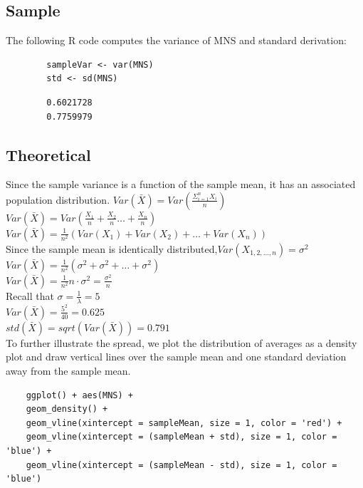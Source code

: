 \documentclass[11pt]{article} %
\begin{document}
\subsection{Sample}
The following R code computes the variance of MNS and standard derivation:
	\begin{lstlisting}
		sampleVar <- var(MNS)
		std <- sd(MNS)
	\end{lstlisting}
	\begin{lstlisting}
		0.6021728
 		0.7759979
	\end{lstlisting}

\subsection{Theoretical}
	Since the sample variance is a function of the sample mean, it has an associated population distribution.
	{\center
		$ Var(\bar{X})  = Var(\frac{\Sigma_{i = 1}^{n}{X_i}}{n}) $ \\ 
		$ Var(\bar{X}) =  Var(\frac{X_1}{n} + \frac{X_2}{n} \ldots + \frac{X_n}{n}) $ \\ 
		$ Var(\bar{X}) = \frac{1}{n^2}(Var(X_1) + Var(X_2) + \ldots + Var(X_n)) $ \\ 
		Since the sample mean is identically distributed,$ Var(X_{1, 2, \ldots, n}) = \sigma^2 $\\ 
		$ Var(\bar{X}) = \frac{1}{n^2}(\sigma^2 + \sigma^2 + \ldots + \sigma^2) $ \\ 
		$ Var(\bar{X}) = \frac{1}{n^2}{n \cdot \sigma^2} = \frac{\sigma^2}{n}$ \\
		Recall that $\sigma = \frac{1}{\lambda} = 5$ \\ 
		$ Var(\bar{X}) = \frac{5^2}{40} = 0.625 $ \\ 
		$ std(\bar{X}) = sqrt(Var(\bar{X})) = 0.791 $ \\
	}
To further illustrate the spread, we plot the distribution of averages as a density plot and draw vertical lines over the sample mean and one standard deviation away from the sample mean. 

\begin{lstlisting}
	ggplot() + aes(MNS) + 
	geom_density() + 
	geom_vline(xintercept = sampleMean, size = 1, color = 'red') +
	geom_vline(xintercept = (sampleMean + std), size = 1, color = 'blue') +
	geom_vline(xintercept = (sampleMean - std), size = 1, color = 'blue')
\end{lstlisting}
\end{document}
